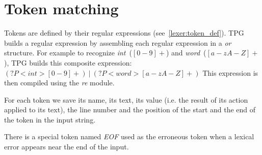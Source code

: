 \section{Token matching}

Tokens are defined by their regular expressions (see~\ref{lexer:token_def}).
TPG builds a regular expression by assembling each regular expression in a \emph{or} structure.
For example to recognize \emph{int}~\mbox{($[0-9]+$)} and \emph{word}~\mbox{($[a-zA-Z]+$)}, TPG builds this composite expression:
$(?P<int>[0-9]+)~|~(?P<word>[a-zA-Z]+)$
This expression is then compiled using the \emph{re} module.

For each token we save its name, its text, its value (i.e. the result of its action applied to its text), the line number and the position of the start and the end of the token in the input string.

There is a special token named \emph{EOF} used as the erroneous token when a lexical error appears near the end of the input.
